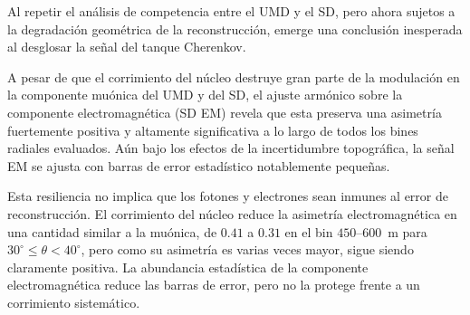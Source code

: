 Al repetir el análisis de competencia entre el UMD y el SD, pero ahora sujetos a la degradación geométrica de la reconstrucción, emerge una conclusión inesperada al desglosar la señal del tanque Cherenkov.

A pesar de que el corrimiento del núcleo destruye gran parte de la modulación en la componente muónica del UMD y del SD, el ajuste armónico sobre la componente electromagnética (SD EM) revela que esta preserva una asimetría fuertemente positiva y altamente significativa a lo largo de todos los bines radiales evaluados. Aún bajo los efectos de la incertidumbre topográfica, la señal EM se ajusta con barras de error estadístico notablemente pequeñas.

Esta resiliencia no implica que los fotones y electrones sean inmunes al error de reconstrucción. El corrimiento del núcleo reduce la asimetría electromagnética en una cantidad similar a la muónica, de $0.41$ a $0.31$ en el bin $450$--$600$~m para $30^\circ \leq \theta < 40^\circ$, pero como su asimetría es varias veces mayor, sigue siendo claramente positiva. La abundancia estadística de la componente electromagnética reduce las barras de error, pero no la protege frente a un corrimiento sistemático.

